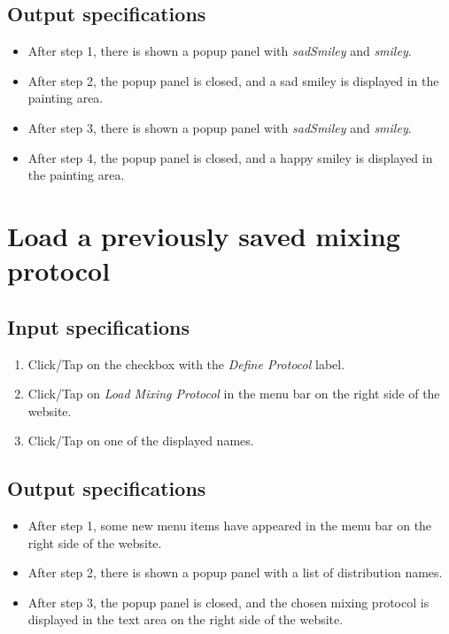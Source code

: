 \subsection*{Output specifications}
\begin{itemize}
\item After step 1, there is shown a popup panel with \emph{sadSmiley} and \emph{smiley}.
\item After step 2, the popup panel is closed, and a sad smiley is displayed in the painting area.
\item After step 3, there is shown a popup panel with \emph{sadSmiley} and \emph{smiley}.
\item After step 4, the popup panel is closed, and a happy smiley is displayed in the painting area.
\end{itemize}

\section{Load a previously saved mixing protocol}

\subsection*{Input specifications}
\begin{enumerate}
\item Click/Tap on the checkbox with the \emph{Define Protocol} label.
\item Click/Tap on \emph{Load Mixing Protocol} in the menu bar on the right side of the website.
\item Click/Tap on one of the displayed names.
\end{enumerate}

\subsection*{Output specifications}
\begin{itemize}
\item After step 1, some new menu items have appeared in the menu bar on the right side of the website.
\item After step 2, there is shown a popup panel with a list of distribution names.
\item After step 3, the popup panel is closed, and the chosen mixing protocol is displayed in the text area on the right side of the website.
\end{itemize}

